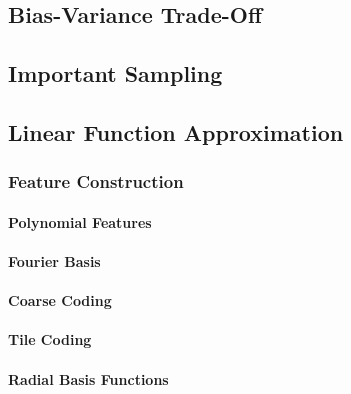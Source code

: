         \subsection{Bias-Variance Trade-Off} %

        \subsection{Important Sampling} %

        \subsection{Linear Function Approximation} %

            \subsubsection{Feature Construction} %

                \paragraph{Polynomial Features} %

                \paragraph{Fourier Basis} %

                \paragraph{Coarse Coding} %

                \paragraph{Tile Coding} %

                \paragraph{Radial Basis Functions} %

